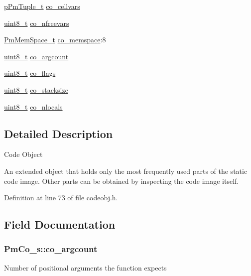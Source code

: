 \begin{DoxyCompactItemize}
\hyperlink{tuple_8h_a02fea741eaf15db9ac9f4f9ca0433ee1}{p\-Pm\-Tuple\-\_\-t} \hyperlink{struct_pm_co__s_a00ea6b3665f02c8e48475b50088a0517}{co\-\_\-cellvars}
\item 
\hyperlink{stdint_8h_aba7bc1797add20fe3efdf37ced1182c5}{uint8\-\_\-t} \hyperlink{struct_pm_co__s_a7ef03b525c173d6bb420b9fcfd0623cc}{co\-\_\-nfreevars}
\item 
\hyperlink{mem_8h_a9c68f72c120fc5a782d464c144aafa2b}{Pm\-Mem\-Space\-\_\-t} \hyperlink{struct_pm_co__s_a3dffa7919c52fc3e83647ddacae4990c}{co\-\_\-memspace}\-:8
\item 
\hyperlink{stdint_8h_aba7bc1797add20fe3efdf37ced1182c5}{uint8\-\_\-t} \hyperlink{struct_pm_co__s_a14f9d2f5809e957eb6ec02290ff6ae3e}{co\-\_\-argcount}
\item 
\hyperlink{stdint_8h_aba7bc1797add20fe3efdf37ced1182c5}{uint8\-\_\-t} \hyperlink{struct_pm_co__s_ae814f78d740cca9d253e46554d951b86}{co\-\_\-flags}
\item 
\hyperlink{stdint_8h_aba7bc1797add20fe3efdf37ced1182c5}{uint8\-\_\-t} \hyperlink{struct_pm_co__s_a0103d66e7361b4400770442e391c2ef8}{co\-\_\-stacksize}
\item 
\hyperlink{stdint_8h_aba7bc1797add20fe3efdf37ced1182c5}{uint8\-\_\-t} \hyperlink{struct_pm_co__s_ad771f7601276ae5fac9d6412d126df29}{co\-\_\-nlocals}
\end{DoxyCompactItemize}


\subsection{Detailed Description}
Code Object

An extended object that holds only the most frequently used parts of the static code image. Other parts can be obtained by inspecting the code image itself. 

Definition at line 73 of file codeobj.\-h.



\subsection{Field Documentation}
\hypertarget{struct_pm_co__s_a14f9d2f5809e957eb6ec02290ff6ae3e}{
\subsubsection[{co\-\_\-argcount}]{ Pm\-Co\-\_\-s\-::co\-\_\-argcount}}\label{struct_pm_co__s_a14f9d2f5809e957eb6ec02290ff6ae3e}
Number of positional arguments the function expects 

